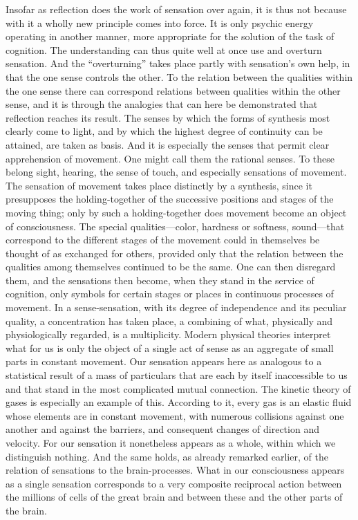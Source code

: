 \documentclass[12pt,a4paper]{book}
\newcommand{\opage}[1]{\marginnote{\footnotesize\textit{[#1]}}}
\begin{document}
Insofar as reflection does the work of sensation over again, it is thus
not because with it a wholly new principle comes into force. It is only
psychic energy operating in another manner, more appropriate for the
solution of the task of cognition. The understanding can thus quite well
\opage{41}at once use and overturn sensation. And the ``overturning'' takes place
partly with sensation's own help, in that the one sense controls the
other. To the relation between the qualities within the one sense there
can correspond relations between qualities within the other sense, and it
is through the analogies that can here be demonstrated that reflection
reaches its result. The senses by which the forms of synthesis most
clearly come to light, and by which the highest degree of continuity can
be attained, are taken as basis. And it is especially the senses that
permit clear apprehension of movement. One might call them the rational
senses. To these belong sight, hearing, the sense of touch, and
especially sensations of movement. The sensation of movement takes place
distinctly by a synthesis, since it presupposes the holding-together of
the successive positions and stages of the moving thing; only by such a
holding-together does movement become an object of consciousness. The
special qualities---color, hardness or softness, sound---that correspond
to the different stages of the movement could in themselves be thought of
as exchanged for others, provided only that the relation between the
qualities among themselves continued to be the same. One can then
disregard them, and the sensations then become, when they stand in the
service of cognition, only symbols for certain stages or places in
continuous processes of movement. In a sense-sensation, with its degree
of independence and its peculiar quality, a concentration has taken
place, a combining of what, physically and physiologically regarded, is a
multiplicity. Modern physical theories interpret what for us is only the
object of a single act of sense as an aggregate of small parts in
constant movement. Our sensation appears here as analogous to a
statistical result of a mass of particulars that are each by itself
inaccessible to us and that stand in the most complicated mutual
connection. The kinetic theory of gases is especially an example of this.
According to it, every gas is an elastic fluid whose elements are in
constant movement, with numerous collisions against one another and
against the barriers, and consequent changes of direction and velocity.
For our sensation it nonetheless appears as a whole, \opage{42}within which we
distinguish nothing. And the same holds, as already remarked earlier, of
the relation of sensations to the brain-processes. What in our
consciousness appears as a single sensation corresponds to a very
composite reciprocal action between the millions of cells of the great
brain and between these and the other parts of the brain.
\end{document}
